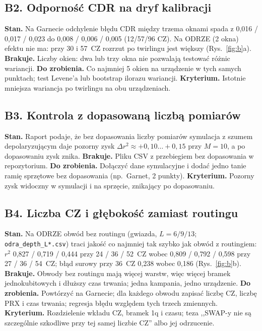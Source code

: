 \documentclass[11pt,a4paper]{article}
\begin{document}
\subsection*{B2. Odporność CDR na dryf kalibracji}
\textbf{Stan.} Na Garnecie odchylenie błędu CDR między trzema oknami spada z
0{,}016 / 0{,}017 / 0{,}023 do 0{,}008 / 0{,}006 / 0{,}005 (12/57/96 CZ). Na ODRZE (2 okna)
efektu nie ma: przy 30 i 57~CZ rozrzut po twirlingu jest większy (Rys.~\ref{fig:b}a).
\textbf{Brakuje.} Liczby okien: dwa lub trzy okna nie pozwalają testować różnic wariancji.
\textbf{Do zrobienia.} Co najmniej 5 okien na urządzenie w tych samych punktach; test
Levene'a lub bootstrap ilorazu wariancji. \textbf{Kryterium.} Istotnie mniejsza wariancja
po twirlingu na obu urządzeniach.

\subsection*{B3. Kontrola z dopasowaną liczbą pomiarów}
\textbf{Stan.} Raport podaje, że bez dopasowania liczby pomiarów symulacja z szumem
depolaryzującym daje pozorny zysk $\Delta r^2\approx+0{,}10\ldots+0{,}15$ przy $M=10$, a po
dopasowaniu zysk znika. \textbf{Brakuje.} Pliku CSV z przebiegiem bez dopasowania w
repozytorium. \textbf{Do zrobienia.} Dołączyć dane symulacyjne i dodać jedno tanie ramię
sprzętowe bez dopasowania (np.\ Garnet, 2 punkty). \textbf{Kryterium.} Pozorny zysk widoczny
w symulacji i na sprzęcie, znikający po dopasowaniu.

\subsection*{B4. Liczba CZ i głębokość zamiast routingu}
\textbf{Stan.} Na ODRZE obwód bez routingu (gwiazda, $L=6/9/13$; \texttt{odra\_depth\_L*.csv})
traci jakość co najmniej tak szybko jak obwód z routingiem: $r^2$ 0{,}827 / 0{,}719 / 0{,}444
przy 24 / 36 / 52~CZ wobec 0{,}809 / 0{,}792 / 0{,}598 przy 27 / 36 / 54~CZ; błąd surowy przy
36~CZ 0{,}238 wobec 0{,}186 (Rys.~\ref{fig:b}b). \textbf{Brakuje.} Obwody bez routingu mają
więcej warstw, więc więcej bramek jednokubitowych i dłuższy czas trwania; jedna kampania,
jedno urządzenie. \textbf{Do zrobienia.} Powtórzyć na Garnecie; dla każdego obwodu zapisać
liczbę CZ, liczbę PRX i czas trwania; regresja błędu względem tych trzech zmiennych.
\textbf{Kryterium.} Rozdzielenie wkładu CZ, bramek 1q i czasu; teza ,,SWAP-y nie są
szczególnie szkodliwe przy tej samej liczbie CZ'' albo jej odrzucenie.
\end{document}
